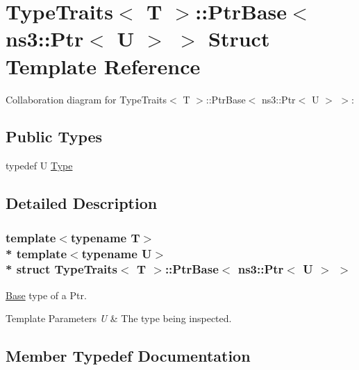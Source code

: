 \hypertarget{structTypeTraits_1_1PtrBase_3_01ns3_1_1Ptr_3_01U_01_4_01_4}{}\section{Type\+Traits$<$ T $>$\+:\+:Ptr\+Base$<$ ns3\+:\+:Ptr$<$ U $>$ $>$ Struct Template Reference}
\label{structTypeTraits_1_1PtrBase_3_01ns3_1_1Ptr_3_01U_01_4_01_4}


Collaboration diagram for Type\+Traits$<$ T $>$\+:\+:Ptr\+Base$<$ ns3\+:\+:Ptr$<$ U $>$ $>$\+:
\subsection*{Public Types}
\begin{DoxyCompactItemize}
\item 
typedef U \hyperlink{structTypeTraits_1_1PtrBase_3_01ns3_1_1Ptr_3_01U_01_4_01_4_a5045cf7c9ab426581362605942a92ed5}{Type}
\end{DoxyCompactItemize}


\subsection{Detailed Description}
\subsubsection*{template$<$typename T$>$\\*
template$<$typename U$>$\\*
struct Type\+Traits$<$ T $>$\+::\+Ptr\+Base$<$ ns3\+::\+Ptr$<$ U $>$ $>$}

\hyperlink{structTypeTraits_1_1Base}{Base} type of a Ptr. 
\begin{DoxyTemplParams}{Template Parameters}
{\em U} & The type being inspected. \\
\hline
\end{DoxyTemplParams}


\subsection{Member Typedef Documentation}
